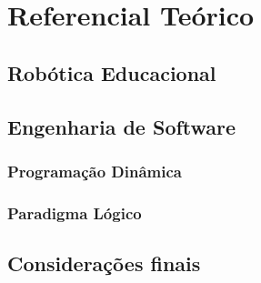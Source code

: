 \chapter{Referencial Teórico}

\section{Robótica Educacional}

\section{Engenharia de Software}
\subsection{Programação Dinâmica}
\subsection{Paradigma Lógico}

\section{Considerações finais}